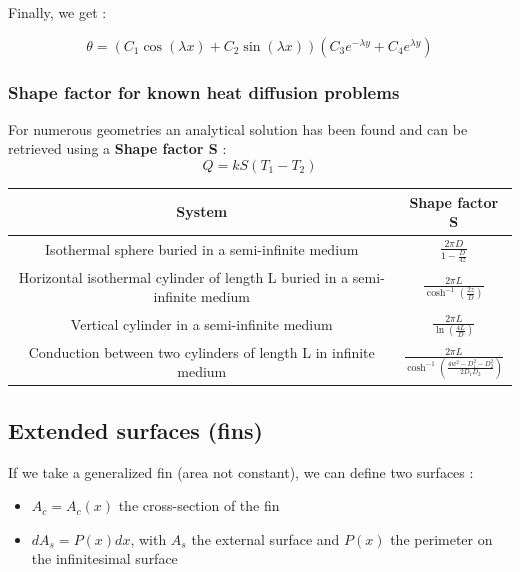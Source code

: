 \documentclass[../main.tex]{subfiles}
\begin{document}
Finally, we get : 

\begin{equation}
    \theta = (C_1\cos(\lambda x) + C_2\sin(\lambda x))(C_3 e^{-\lambda y} + C_4 e^{\lambda y})
\end{equation}

\subsubsection{Shape factor for known heat diffusion problems}

For numerous geometries an analytical solution has been found and can be retrieved using a \textbf{Shape factor S} : 
\begin{equation}
    Q = kS(T_1-T_2)
\end{equation}

\begin{table}[hbt!]
    \centering
    \begin{tabular}{c|c}
        System & Shape factor S\\
        \hline
        Isothermal sphere buried in a semi-infinite medium & $\frac{2\pi D}{1-\frac{D}{4z}}$ \\
        Horizontal isothermal cylinder of length L buried in a semi-infinite medium & $\frac{2\pi L}{\cosh^{-1}(\frac{2 z}{D})}$\\
        Vertical cylinder in a semi-infinite medium & $\frac{2\pi L}{\ln(\frac{4L}{D})}$\\
        Conduction between two cylinders of length L in infinite medium & $\frac{2\pi L}{\cosh^{-1}(\frac{4w^2-D_1^2-D_2^2}{2D_1D_2})}$\\
    \end{tabular}

\end{table}

\subsection{Extended surfaces (fins)}

If we take a generalized fin (area not constant), we can define two surfaces :\begin{itemize}
    \item $A_c = A_c(x)$ the cross-section of the fin\\
    \item $dA_s = P(x)dx$, with $A_s$ the external surface and $P(x)$ the perimeter on the infinitesimal surface\\
\end{itemize}
\end{document}

